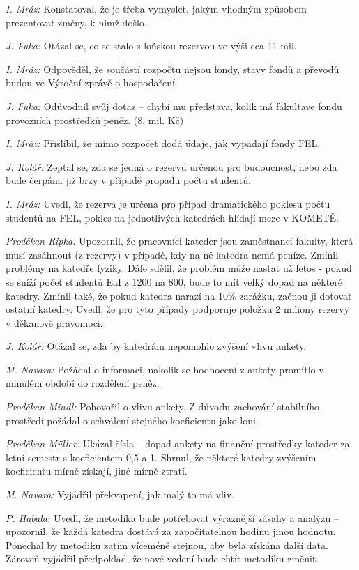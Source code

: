 \documentclass[a4paper,12pt,notitlepage,oneside]{article}
\begin{document}
\textit{I. Mráz:} Konstatoval, že je třeba vymyslet, jakým vhodným způsobem prezentovat změny, k nimž došlo.

\textit{J. Fuka:} Otázal se, co se stalo s loňskou rezervou ve výši cca 11 mil.

\textit{I. Mráz:} Odpověděl, že součástí rozpočtu nejsou fondy, stavy fondů a převodů budou ve Výroční zprávě o hospodaření.

\textit{J. Fuka:} Odůvodnil svůj dotaz – chybí mu představa, kolik má fakultave fondu provozních prostředků peněz. (8. mil. Kč)

\textit{I. Mráz:} Přislíbil, že mimo rozpočet dodá údaje, jak vypadají fondy FEL.

\textit{J. Kolář:} Zeptal se, zda se jedná o rezervu určenou pro budoucnost, nebo zda bude čerpána již brzy v případě propadu počtu studentů.

\textit{I. Mráz:} Uvedl, že rezerva je určena pro případ dramatického poklesu počtu studentů na FEL, pokles na jednotlivých katedrách hlídají meze v KOMETĚ.

\textit{Proděkan Ripka:} Upozornil, že pracovníci kateder jsou zaměstnanci fakulty, která musí zasáhnout (z rezervy) v případě, kdy na ně katedra nemá peníze. Zmínil problémy na katedře fyziky. Dále sdělil, že problém může nastat už letos - pokud se sníží počet studentů EaI z 1200 na 800, bude to mít velký dopad na některé katedry. Zmínil také, že pokud katedra narazí na 10\% zarážku, začnou ji dotovat ostatní katedry. Uvedl, že pro tyto případy podporuje položku 2 miliony rezervy v děkanově pravomoci.

\textit{J. Kolář:} Otázal se, zda by katedrám nepomohlo zvýšení vlivu ankety.

\textit{M. Navara:} Požádal o informaci, nakolik se hodnocení z ankety promítlo v minulém období do rozdělení peněz.

\textit{Proděkan Mindl:} Pohovořil o vlivu ankety. Z důvodu zachování stabilního prostředí požádal o schválení stejného koeficientu jako loni.

\textit{Proděkan Müller:} Ukázal čísla – dopad ankety na finanční prostředky kateder za letní semestr s koeficientem 0,5 a 1. Shrnul, že některé katedry zvýšením koeficientu mírně získají, jiné mírně ztratí.

\textit{M. Navara:} Vyjádřil překvapení, jak malý to má vliv.

\textit{P. Habala:} Uvedl, že metodika bude potřebovat výraznější zásahy a analýzu – upozornil, že každá katedra dostává za započitatelnou hodinu jinou hodnotu. Ponechal by metodiku zatím víceméně stejnou, aby byla získána další data. Zároveň vyjádřil předpoklad, že nové vedení bude chtít metodiku změnit.
\end{document}
